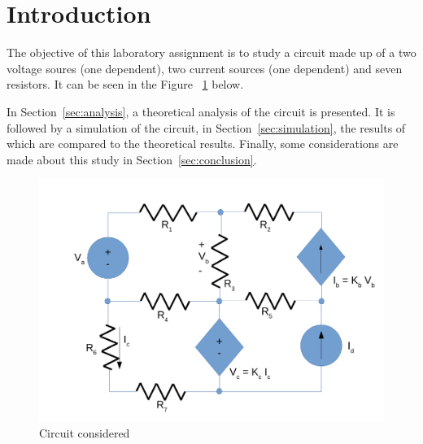 \newpage

\section{Introduction}
\label{sec:introduction}

The objective of this laboratory assignment is to study a circuit made up of a two voltage soures (one dependent), two current sources (one dependent) and seven resistors. It can be seen in the Figure ~\ref{circuit} below.

In Section~\ref{sec:analysis}, a theoretical analysis of the circuit is presented. It is followed by a simulation of the circuit, in Section~\ref{sec:simulation}, the results of which are compared to the theoretical results. Finally, some considerations are made about this study in Section~\ref{sec:conclusion}.


\begin{figure}[H]
  \centering
  \includegraphics[width=0.5\linewidth]{simple.pdf}
  \caption{Circuit considered}
  \label{circuit}
\end{figure}

